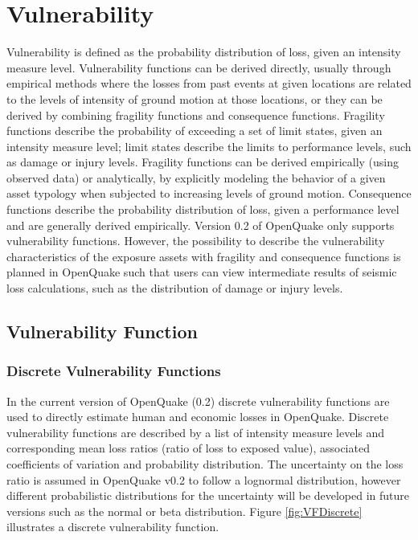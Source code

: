 \section{Vulnerability}
Vulnerability is defined as the probability distribution of loss, given an intensity measure level. Vulnerability functions can be derived directly, usually through empirical methods where the losses from past events at given locations are related to the levels of intensity of ground motion at those locations, or they can be derived by combining fragility functions and consequence functions. Fragility functions describe the probability of exceeding a set of limit states, given an intensity measure level; limit states describe the limits to performance levels, such as damage or injury levels. Fragility functions can be derived empirically (using observed data) or analytically, by explicitly modeling the behavior of a given asset typology when subjected to increasing levels of ground motion. Consequence functions describe the probability distribution of loss, given a performance level and are generally derived empirically. 
Version 0.2 of OpenQuake only supports vulnerability functions. However, the possibility to describe the vulnerability characteristics of the exposure assets with fragility and consequence functions is planned in OpenQuake such that users can view intermediate results of seismic loss calculations, such as the distribution of damage or injury levels. 

\subsection{Vulnerability Function}
\subsubsection{Discrete Vulnerability Functions}
In the current version of OpenQuake (0.2) discrete vulnerability functions are used to directly estimate human and economic losses in OpenQuake. Discrete vulnerability functions are described by a list of intensity measure levels and corresponding mean loss ratios (ratio of loss to exposed value), associated coefficients of variation and probability distribution. The uncertainty on the loss ratio is assumed in OpenQuake v0.2 to follow a lognormal distribution, however different probabilistic distributions for the uncertainty will be developed in future versions such as the normal or beta distribution. Figure \ref{fig:VFDiscrete} illustrates a discrete vulnerability function.

